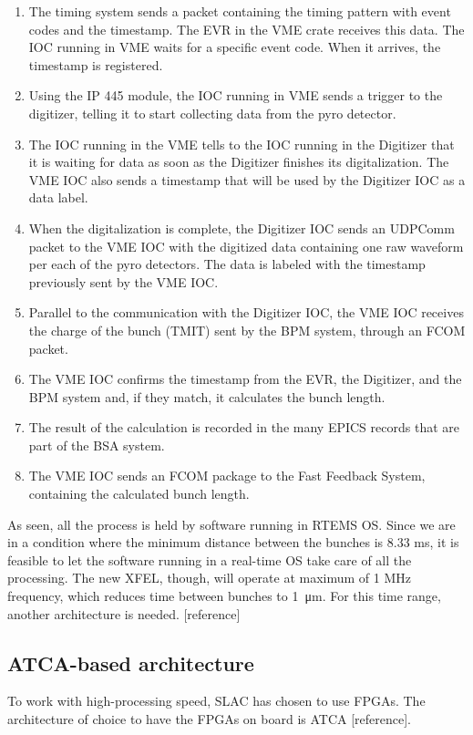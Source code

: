\documentclass[letter,
               biblatex,     %
               keeplastbox,   %
               ]{jacow}
\begin{document}
\begin{enumerate}
   \item The timing system sends a packet containing the timing pattern with event codes and the timestamp. The EVR in the VME crate receives this data. The IOC running in VME waits for a specific event code. When it arrives, the timestamp is registered.
   \item Using the IP 445 module, the IOC running in VME sends a trigger to the digitizer, telling it to start collecting data from the pyro detector.
   \item The IOC running in the VME tells to the IOC running in the Digitizer that it is waiting for data as soon as the Digitizer finishes its digitalization. The VME IOC also sends a timestamp that will be used by the Digitizer IOC as a data label.
   \item When the digitalization is complete, the Digitizer IOC sends an UDPComm packet to the VME IOC with the digitized data containing one raw waveform per each of the pyro detectors. The data is labeled with the timestamp previously sent by the VME IOC. 
   \item Parallel to the communication with the Digitizer IOC, the VME IOC receives the charge of the bunch (TMIT) sent by the BPM system, through an FCOM packet.
   \item The VME IOC confirms the timestamp from the EVR, the Digitizer, and the BPM system and, if they match, it calculates the bunch length.
   \item The result of the calculation is recorded in the many EPICS records that are part of the BSA system.
   \item The VME IOC sends an FCOM package to the Fast Feedback System, containing the calculated bunch length.
\end{enumerate}

As seen, all the process is held by software running in RTEMS OS. Since we are in a condition where the minimum distance between the bunches is 8.33 ms, it is feasible to let the software running in a real-time OS take care of all the processing. The new XFEL, though, will operate at maximum of 1 MHz frequency, which reduces time between bunches to \SI{1}{\micro\meter}. For this time range, another architecture is needed. [reference]

\subsection{ATCA-based architecture}
To work with high-processing speed, SLAC has chosen to use FPGAs. The architecture of choice to have the FPGAs on board is ATCA [reference].
\end{document}
